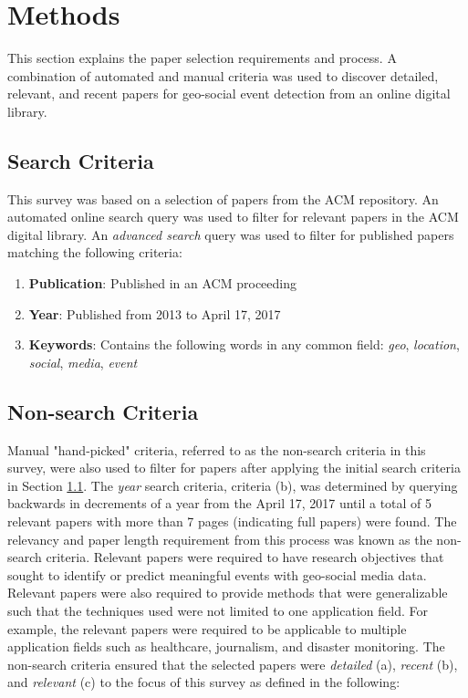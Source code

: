 \section{Methods} \label{methods}

This section explains the paper selection requirements and process. A combination of automated and manual criteria was used to discover detailed, relevant, and recent papers for geo-social event detection from an online digital library.

\subsection{Search Criteria} \label{search-criteria}

This survey was based on a selection of papers from the ACM repository. An automated online search query was used to filter for relevant papers in the ACM digital library. An \textit{advanced search} query was used to filter for published papers matching the following criteria:

\begin{enumerate}[label=(\alph*)]
  \item \textbf{Publication}: Published in an ACM proceeding
  \item \textbf{Year}: Published from 2013 to April 17, 2017
  \item \textbf{Keywords}: Contains the following words in any common field: \textit{geo}, \textit{location}, \textit{social}, \textit{media}, \textit{event}
\end{enumerate}

\subsection{Non-search Criteria} \label{non-search-criteria}

Manual "hand-picked" criteria, referred to as the non-search criteria in this survey, were also used to filter for papers after applying the initial search criteria in Section \ref{search-criteria}. The \textit{year} search criteria, criteria (b), was determined by querying backwards in decrements of a year from the April 17, 2017 until a total of 5 relevant papers with more than 7 pages (indicating full papers) were found. The relevancy and paper length requirement from this process was known as the non-search criteria. Relevant papers were required to have research objectives that sought to identify or predict meaningful events with geo-social media data. Relevant papers were also required to provide methods that were generalizable such that the techniques used were not limited to one application field. For example, the relevant papers were required to be applicable to multiple application fields such as healthcare, journalism, and disaster monitoring. The non-search criteria ensured that the selected papers were \textit{detailed} (a), \textit{recent} (b), and \textit{relevant} (c) to the focus of this survey as defined in the following:

